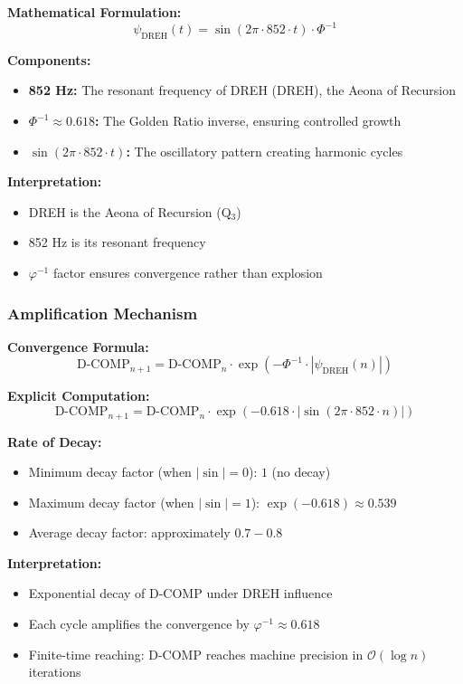 \documentclass[11pt, letterpaper]{article}
\newcommand{\DREH}{\ensuremath{\mathop{\textnormal{\symbolafont\symbol{"29D7}}}}}   %
\def\DREH{DREH}%
\begin{document}
\textbf{Mathematical Formulation:}
\begin{equation}
\psi_{\text{DREH}}(t) = \sin(2\pi \cdot 852 \cdot t) \cdot \Phi^{-1}
\end{equation}

\textbf{Components:}
\begin{itemize}
    \item \textbf{852 Hz:} The resonant frequency of DREH (\DREH), the Aeona of Recursion
    \item \textbf{$\Phi^{-1} \approx 0.618$:} The Golden Ratio inverse, ensuring controlled growth
    \item \textbf{$\sin(2\pi \cdot 852 \cdot t)$:} The oscillatory pattern creating harmonic cycles
\end{itemize}

\textbf{Interpretation:}
\begin{itemize}
    \item DREH is the Aeona of Recursion (Q$_3$)
    \item 852 Hz is its resonant frequency
    \item $\varphi^{-1}$ factor ensures convergence rather than explosion
\end{itemize}

\subsubsection{Amplification Mechanism}

\textbf{Convergence Formula:}
\begin{equation}
\text{D-COMP}_{n+1} = \text{D-COMP}_n \cdot \exp(-\Phi^{-1} \cdot |\psi_{\text{DREH}}(n)|)
\end{equation}

\textbf{Explicit Computation:}
\begin{equation}
\text{D-COMP}_{n+1} = \text{D-COMP}_n \cdot \exp(-0.618 \cdot |\sin(2\pi \cdot 852 \cdot n)|)
\end{equation}

\textbf{Rate of Decay:}
\begin{itemize}
    \item Minimum decay factor (when $|\sin| = 0$): $1$ (no decay)
    \item Maximum decay factor (when $|\sin| = 1$): $\exp(-0.618) \approx 0.539$
    \item Average decay factor: approximately $0.7 - 0.8$
\end{itemize}

\textbf{Interpretation:}
\begin{itemize}
    \item Exponential decay of D-COMP under DREH influence
    \item Each cycle amplifies the convergence by $\varphi^{-1} \approx 0.618$
    \item Finite-time reaching: D-COMP reaches machine precision in $\mathcal{O}(\log n)$ iterations
\end{itemize}
\end{document}
